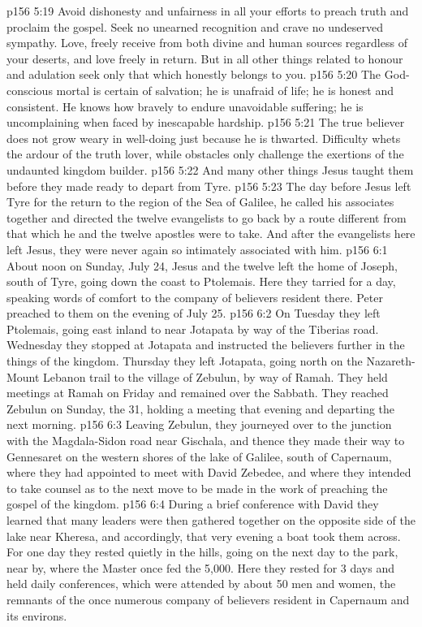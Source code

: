 \vs p156 5:19 Avoid dishonesty and unfairness in all your efforts to preach truth and proclaim the gospel. Seek no unearned recognition and crave no undeserved sympathy. Love, freely receive from both divine and human sources regardless of your deserts, and love freely in return. But in all other things related to honour and adulation seek only that which honestly belongs to you.
\vs p156 5:20 The God\hyp{}conscious mortal is certain of salvation; he is unafraid of life; he is honest and consistent. He knows how bravely to endure unavoidable suffering; he is uncomplaining when faced by inescapable hardship.
\vs p156 5:21 The true believer does not grow weary in well\hyp{}doing just because he is thwarted. Difficulty whets the ardour of the truth lover, while obstacles only challenge the exertions of the undaunted kingdom builder.
\vs p156 5:22 \pc And many other things Jesus taught them before they made ready to depart from Tyre.
\vs p156 5:23 The day before Jesus left Tyre for the return to the region of the Sea of Galilee, he called his associates together and directed the twelve evangelists to go back by a route different from that which he and the twelve apostles were to take. And after the evangelists here left Jesus, they were never again so intimately associated with him.
\vs p156 6:1 About noon on Sunday, July 24, Jesus and the twelve left the home of Joseph, south of Tyre, going down the coast to Ptolemais. Here they tarried for a day, speaking words of comfort to the company of believers resident there. Peter preached to them on the evening of July 25.
\vs p156 6:2 On Tuesday they left Ptolemais, going east inland to near Jotapata by way of the Tiberias road. Wednesday they stopped at Jotapata and instructed the believers further in the things of the kingdom. Thursday they left Jotapata, going north on the Nazareth\hyp{}Mount Lebanon trail to the village of Zebulun, by way of Ramah. They held meetings at Ramah on Friday and remained over the Sabbath. They reached Zebulun on Sunday, the 31, holding a meeting that evening and departing the next morning.
\vs p156 6:3 Leaving Zebulun, they journeyed over to the junction with the Magdala\hyp{}Sidon road near Gischala, and thence they made their way to Gennesaret on the western shores of the lake of Galilee, south of Capernaum, where they had appointed to meet with David Zebedee, and where they intended to take counsel as to the next move to be made in the work of preaching the gospel of the kingdom.
\vs p156 6:4 During a brief conference with David they learned that many leaders were then gathered together on the opposite side of the lake near Kheresa, and accordingly, that very evening a boat took them across. For one day they rested quietly in the hills, going on the next day to the park, near by, where the Master once fed the 5,000. Here they rested for 3 days and held daily conferences, which were attended by about 50 men and women, the remnants of the once numerous company of believers resident in Capernaum and its environs.
